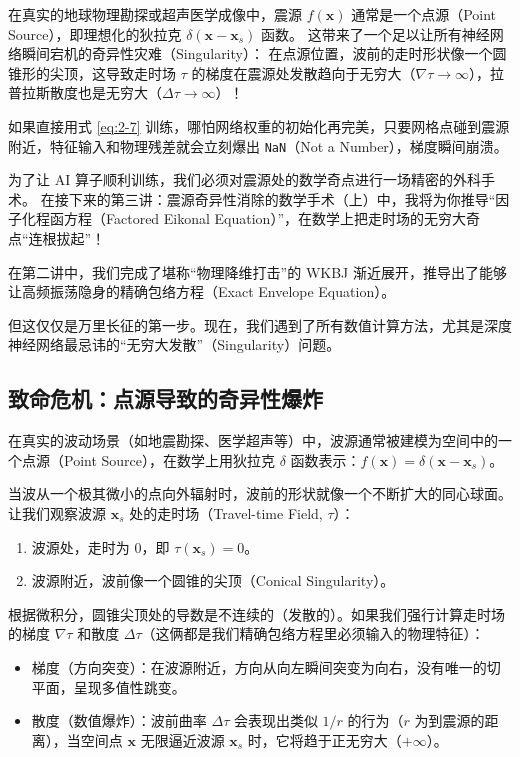 \documentclass[12pt]{article}
\begin{document}
{在真实的地球物理勘探或超声医学成像中，震源 $f(\mathbf{x})$ 通常是一个点源（Point Source），即理想化的狄拉克 $\delta(\mathbf{x}-\mathbf{x}_s)$ 函数。
这带来了一个足以让所有神经网络瞬间宕机的奇异性灾难（Singularity）：
在点源位置，波前的走时形状像一个圆锥形的尖顶，这导致走时场 $\tau$ 的梯度在震源处发散趋向于无穷大（$\nabla \tau \to \infty$），拉普拉斯散度也是无穷大（$\Delta \tau \to \infty$）！

如果直接用式 \eqref{eq:2-7} 训练，哪怕网络权重的初始化再完美，只要网格点碰到震源附近，特征输入和物理残差就会立刻爆出 \texttt{NaN}（Not a Number），梯度瞬间崩溃。

为了让 AI 算子顺利训练，我们必须对震源处的数学奇点进行一场精密的外科手术。
在接下来的第三讲：震源奇异性消除的数学手术（上）中，我将为你推导“因子化程函方程（Factored Eikonal Equation）”，在数学上把走时场的无穷大奇点“连根拔起”！


在第二讲中，我们完成了堪称“物理降维打击”的 WKBJ 渐近展开，推导出了能够让高频振荡隐身的精确包络方程（Exact Envelope Equation）。

但这仅仅是万里长征的第一步。现在，我们遇到了所有数值计算方法，尤其是深度神经网络最忌讳的“无穷大发散”（Singularity）问题。

\subsection{致命危机：点源导致的奇异性爆炸}

在真实的波动场景（如地震勘探、医学超声等）中，波源通常被建模为空间中的一个点源（Point Source），在数学上用狄拉克 $\delta$ 函数表示：$f(\mathbf{x}) = \delta(\mathbf{x} - \mathbf{x}_s)$。

当波从一个极其微小的点向外辐射时，波前的形状就像一个不断扩大的同心球面。
让我们观察波源 $\mathbf{x}_s$ 处的走时场（Travel-time Field, $\tau$）：

\begin{enumerate}[leftmargin=2em]
    \item 波源处，走时为 0，即 $\tau(\mathbf{x}_s) = 0$。
    \item 波源附近，波前像一个圆锥的尖顶（Conical Singularity）。
\end{enumerate}

根据微积分，圆锥尖顶处的导数是不连续的（发散的）。如果我们强行计算走时场的梯度 $\nabla \tau$ 和散度 $\Delta \tau$（这俩都是我们精确包络方程里必须输入的物理特征）：

\begin{itemize}[leftmargin=2em]
    \item 梯度（方向突变）：在波源附近，方向从向左瞬间突变为向右，没有唯一的切平面，呈现多值性跳变。
    \item 散度（数值爆炸）：波前曲率 $\Delta \tau$ 会表现出类似 $1/r$ 的行为（$r$ 为到震源的距离），当空间点 $\mathbf{x}$ 无限逼近波源 $\mathbf{x}_s$ 时，它将趋于正无穷大（$+\infty$）。
\end{itemize}

}
\end{document}
